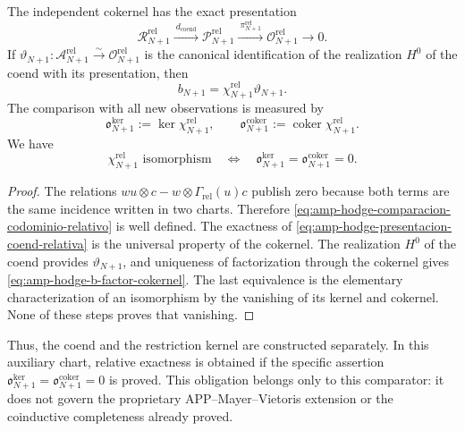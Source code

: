 \begin{lemma}
\label{lem:amp-hodge-comparacion-codominio-relativo}
The independent cokernel has the exact presentation
\begin{equation}\label{eq:amp-hodge-presentacion-coend-relativa}
 \mathscr R_{N+1}^{\mathrm{rel}}
 \xrightarrow{\ d_{\mathrm{coend}}\ }
 \mathscr P_{N+1}^{\mathrm{rel}}
 \xrightarrow{\ \pi_{N+1}^{\mathrm{rel}}\ }
 \mathscr O_{N+1}^{\mathrm{rel}}\longrightarrow0 .
\end{equation}
If
\(\vartheta_{N+1}:\mathscr A_{N+1}^{\mathrm{rel}}
\xrightarrow{\sim}\mathscr O_{N+1}^{\mathrm{rel}}\)
is the canonical identification of the realization \(H^0\) of the coend with its
presentation, then
\begin{equation}\label{eq:amp-hodge-b-factor-cokernel}
 b_{N+1}
 =\chi_{N+1}^{\mathrm{rel}}\vartheta_{N+1}.
\end{equation}
The comparison with all new observations is measured by
\begin{equation}\label{eq:amp-hodge-obstrucciones-comparacion}
 \mathfrak o_{N+1}^{\ker}
 :=\ker\chi_{N+1}^{\mathrm{rel}},
 \qquad
 \mathfrak o_{N+1}^{\mathrm{coker}}
 :=\operatorname{coker}\chi_{N+1}^{\mathrm{rel}}.
\end{equation}
We have
\[
 \chi_{N+1}^{\mathrm{rel}}\text{ isomorphism}
 \quad\Longleftrightarrow\quad
 \mathfrak o_{N+1}^{\ker}
 =\mathfrak o_{N+1}^{\mathrm{coker}}=0.
\]
\end{lemma}

\begin{proof}
The relations
\(wu\otimes c-w\otimes\Gamma_{\mathrm{rel}}(u)c\) publish zero because
both terms are the same incidence written in two charts. Therefore
\eqref{eq:amp-hodge-comparacion-codominio-relativo} is well defined.
The exactness of \eqref{eq:amp-hodge-presentacion-coend-relativa} is the
universal property of the cokernel. The realization \(H^0\) of the coend
provides \(\vartheta_{N+1}\), and uniqueness of factorization through the
cokernel gives \eqref{eq:amp-hodge-b-factor-cokernel}. The last equivalence
is the elementary characterization of an isomorphism by the vanishing of its
kernel and cokernel. None of these steps proves that vanishing.
\end{proof}

Thus, the coend and the restriction kernel are constructed separately. In
this auxiliary chart, relative exactness is obtained if the specific
assertion
\(\mathfrak o_{N+1}^{\ker}
=\mathfrak o_{N+1}^{\mathrm{coker}}=0\) is proved. This obligation belongs only to
this comparator: it does not govern the proprietary
APP--Mayer--Vietoris extension or the coinductive completeness already proved.

